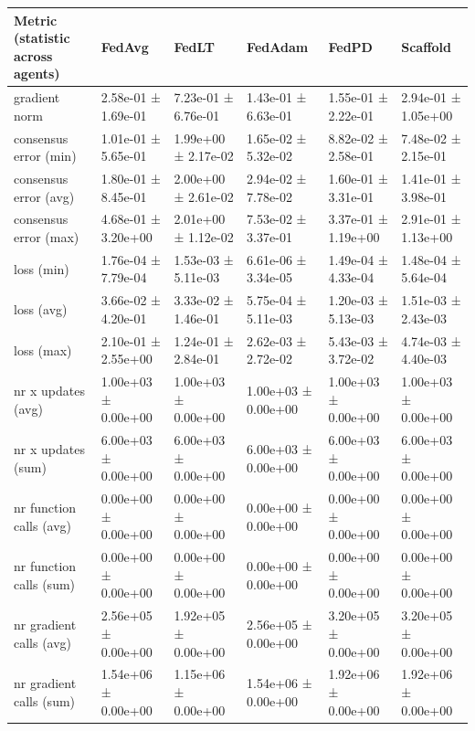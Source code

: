 \begin{tabular}{llllll}
\hline
 Metric (statistic across agents)   & FedAvg              & FedLT               & FedAdam             & FedPD               & Scaffold            \\
\hline
 gradient norm                      & 2.58e-01 ± 1.69e-01 & 7.23e-01 ± 6.76e-01 & 1.43e-01 ± 6.63e-01 & 1.55e-01 ± 2.22e-01 & 2.94e-01 ± 1.05e+00 \\
 consensus error (min)              & 1.01e-01 ± 5.65e-01 & 1.99e+00 ± 2.17e-02 & 1.65e-02 ± 5.32e-02 & 8.82e-02 ± 2.58e-01 & 7.48e-02 ± 2.15e-01 \\
 consensus error (avg)              & 1.80e-01 ± 8.45e-01 & 2.00e+00 ± 2.61e-02 & 2.94e-02 ± 7.78e-02 & 1.60e-01 ± 3.31e-01 & 1.41e-01 ± 3.98e-01 \\
 consensus error (max)              & 4.68e-01 ± 3.20e+00 & 2.01e+00 ± 1.12e-02 & 7.53e-02 ± 3.37e-01 & 3.37e-01 ± 1.19e+00 & 2.91e-01 ± 1.13e+00 \\
 loss (min)                         & 1.76e-04 ± 7.79e-04 & 1.53e-03 ± 5.11e-03 & 6.61e-06 ± 3.34e-05 & 1.49e-04 ± 4.33e-04 & 1.48e-04 ± 5.64e-04 \\
 loss (avg)                         & 3.66e-02 ± 4.20e-01 & 3.33e-02 ± 1.46e-01 & 5.75e-04 ± 5.11e-03 & 1.20e-03 ± 5.13e-03 & 1.51e-03 ± 2.43e-03 \\
 loss (max)                         & 2.10e-01 ± 2.55e+00 & 1.24e-01 ± 2.84e-01 & 2.62e-03 ± 2.72e-02 & 5.43e-03 ± 3.72e-02 & 4.74e-03 ± 4.40e-03 \\
 nr x updates (avg)                 & 1.00e+03 ± 0.00e+00 & 1.00e+03 ± 0.00e+00 & 1.00e+03 ± 0.00e+00 & 1.00e+03 ± 0.00e+00 & 1.00e+03 ± 0.00e+00 \\
 nr x updates (sum)                 & 6.00e+03 ± 0.00e+00 & 6.00e+03 ± 0.00e+00 & 6.00e+03 ± 0.00e+00 & 6.00e+03 ± 0.00e+00 & 6.00e+03 ± 0.00e+00 \\
 nr function calls (avg)            & 0.00e+00 ± 0.00e+00 & 0.00e+00 ± 0.00e+00 & 0.00e+00 ± 0.00e+00 & 0.00e+00 ± 0.00e+00 & 0.00e+00 ± 0.00e+00 \\
 nr function calls (sum)            & 0.00e+00 ± 0.00e+00 & 0.00e+00 ± 0.00e+00 & 0.00e+00 ± 0.00e+00 & 0.00e+00 ± 0.00e+00 & 0.00e+00 ± 0.00e+00 \\
 nr gradient calls (avg)            & 2.56e+05 ± 0.00e+00 & 1.92e+05 ± 0.00e+00 & 2.56e+05 ± 0.00e+00 & 3.20e+05 ± 0.00e+00 & 3.20e+05 ± 0.00e+00 \\
 nr gradient calls (sum)            & 1.54e+06 ± 0.00e+00 & 1.15e+06 ± 0.00e+00 & 1.54e+06 ± 0.00e+00 & 1.92e+06 ± 0.00e+00 & 1.92e+06 ± 0.00e+00 \\

\end{tabular}
